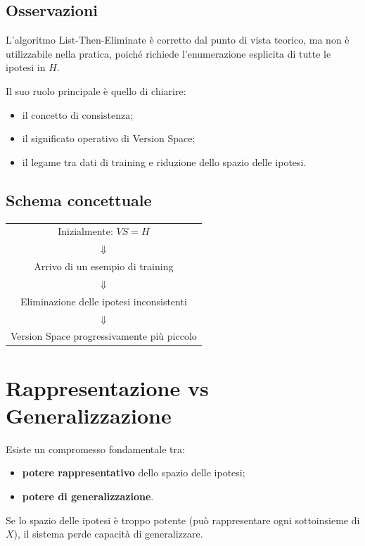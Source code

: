 \documentclass[a4paper,12pt]{report}
\begin{document}
\subsection{Osservazioni}

L’algoritmo List-Then-Eliminate è corretto dal punto di vista teorico, ma non è utilizzabile nella pratica, poiché richiede l’enumerazione esplicita di tutte le ipotesi in \( H \).

Il suo ruolo principale è quello di chiarire:
\begin{itemize}
    \item il concetto di consistenza;
    \item il significato operativo di Version Space;
    \item il legame tra dati di training e riduzione dello spazio delle ipotesi.
\end{itemize}

\subsection*{Schema concettuale}

\begin{center}
\begin{tabular}{c}
Inizialmente: \( VS = H \) \\
\(\Downarrow\) \\
Arrivo di un esempio di training \\
\(\Downarrow\) \\
Eliminazione delle ipotesi inconsistenti \\
\(\Downarrow\) \\
Version Space progressivamente più piccolo
\end{tabular}
\end{center}


\section{Rappresentazione vs Generalizzazione}

Esiste un compromesso fondamentale tra:
\begin{itemize}
    \item \textbf{potere rappresentativo} dello spazio delle ipotesi;
    \item \textbf{potere di generalizzazione}.
\end{itemize}

Se lo spazio delle ipotesi è troppo potente (può rappresentare ogni sottoinsieme di $X$), il sistema perde capacità di generalizzare.
\end{document}
